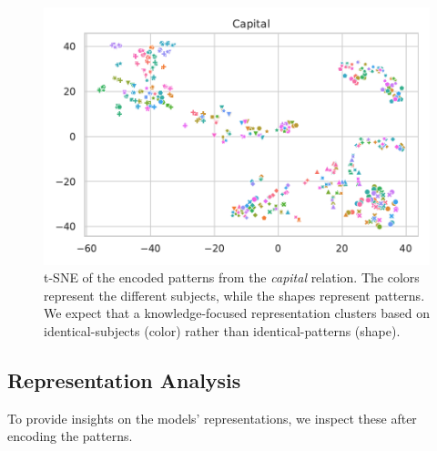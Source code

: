 \begin{figure}[t!]
\centering
\vspace{-0.1in}
\includegraphics[width=.8\columnwidth]{figures/capital-bert-large}


\caption{t-SNE of the encoded patterns from the
  \textit{capital} relation. The colors
  represent the different subjects, while the shapes
  represent patterns. We expect that a knowledge-focused representation clusters based on identical-subjects (color) rather than identical-patterns (shape).}
  \vspace{-0.2in}
\label{fig:tsne-emb}

\end{figure}

\subsection{Representation Analysis}


To provide insights on the models' representations, we inspect these after encoding the patterns.

